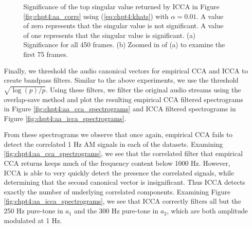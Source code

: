 \begin{figure}
  \begin{center}
    \caption{Significance of the top singular value returned by ICCA in Figure
      \ref{fig:chpt4:aa_corrs} using (\ref{eq:chpt4:khats}) with $\alpha=0.01$. A
      value of zero represents that the singular value is not significant. A value of one
      represents that the singular value is significant. (a) Significance for all 450
      frames. (b) Zoomed in of (a) to examine the first 75 frames.}
    \label{fig:chpt4:aa_sigs}
  \end{center}
\end{figure}

Finally, we threshold the audio canonical vectors for empirical CCA and ICCA to create
bandpass filters. Similar to the above experiments, we use the threshold
$\sqrt{\log(p)/p}$. Using these filters, we filter the original audio streams using the
overlap-save method and plot the resulting empirical CCA filtered spectrograms in Figure
\ref{fig:chpt4:aa_cca_spectrograms} and ICCA filtered spectrograms in Figure
\ref{fig:chpt4:aa_icca_spectrograms}.

From these spectrograms we observe that once again, empirical CCA fails to detect the
correlated 1 Hz AM signals in each of the datasets. Examining
\ref{fig:chpt4:aa_cca_spectrograms}, we see that the correlated filter that empirical CCA
returns keeps much of the frequency content below 1000 Hz. However, ICCA is able to very
quickly detect the presence the correlated signals, while determining that the second
canonical vector is insignificant. Thus ICCA detects exactly the number of underlying
correlated components. Examining Figure \ref{fig:chpt4:aa_icca_spectrograms}, we see that
ICCA correctly filters all but the 250 Hz pure-tone in $a_1$ and the 300 Hz pure-tone in
$a_2$, which are both amplitude modulated at 1 Hz.

